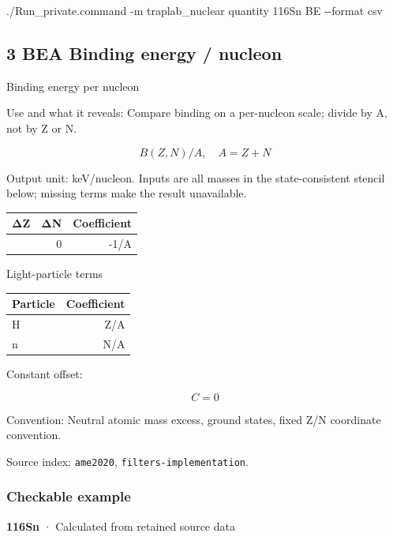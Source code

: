 \documentclass[
  11pt,
  letterpaper,
]{article}
\newenvironment{Shaded}{}{}
\newcommand{\AttributeTok}[1]{\textcolor[rgb]{0.49,0.56,0.16}{#1}}
\newcommand{\ExtensionTok}[1]{#1}
\newcommand{\NormalTok}[1]{#1}
\begin{document}
\begin{Shaded}
\begin{Highlighting}[]
\ExtensionTok{./Run\_private.command} \AttributeTok{{-}m}\NormalTok{ traplab\_nuclear quantity 116Sn BE }\AttributeTok{{-}{-}format}\NormalTok{ csv}
\end{Highlighting}
\end{Shaded}

\subsection{3 BEA Binding energy /
nucleon}\label{bea-binding-energy-nucleon}

Binding energy per nucleon

Use and what it reveals: Compare binding on a per-nucleon scale; divide
by A, not by Z or N.

\[
B(Z,N)/A,\quad A=Z+N
\]

Output unit: keV/nucleon. Inputs are all masses in the state-consistent
stencil below; missing terms make the result unavailable.

\begin{longtable}[]{@{}rrr@{}}
\toprule\noalign{}
ΔZ & ΔN & Coefficient \\
\midrule\noalign{}
\endhead
\bottomrule\noalign{}
\endlastfoot
0 & 0 & -1/A \\
\end{longtable}

Light-particle terms

\begin{longtable}[]{@{}lr@{}}
\toprule\noalign{}
Particle & Coefficient \\
\midrule\noalign{}
\endhead
\bottomrule\noalign{}
\endlastfoot
H & Z/A \\
n & N/A \\
\end{longtable}

Constant offset:

\[
C=0
\]

Convention: Neutral atomic mass excess, ground states, fixed Z/N
coordinate convention.

Source index: \texttt{ame2020}, \texttt{filters-implementation}.

\subsubsection{Checkable example}\label{checkable-example-2}

\textbf{116Sn} · Calculated from retained source data
\end{document}
